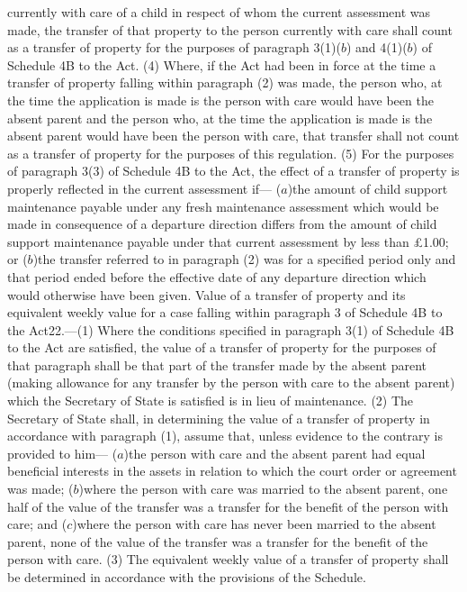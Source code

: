 \documentclass[a4paper]{article}
\begin{document}
currently with care of a child in respect of whom the current assessment was
made, the transfer of that property to the person currently with care shall
count as a transfer of property for the purposes of paragraph 3(1)($b$) and
4(1)($b$) of Schedule 4B to the Act.
(4) Where, if the Act had been in force at the time a transfer of property
falling within paragraph (2) was made, the person who, at the time the
application is made is the person with care would have been the absent parent
and the person who, at the time the application is made is the absent parent
would have been the person with care, that transfer shall not count as a
transfer of property for the purposes of this regulation.
(5) For the purposes of paragraph 3(3) of Schedule 4B to the Act, the effect of
a transfer of property is properly reflected in the current assessment if—
($a$)the amount of child support maintenance payable under any fresh maintenance
assessment which would be made in consequence of a departure direction differs
from the amount of child support maintenance payable under that current
assessment by less than £1.00; or
($b$)the transfer referred to in paragraph (2) was for a specified period only and
that period ended before the effective date of any departure direction which
would otherwise have been given.
Value of a transfer of property and its equivalent weekly value for a case
falling within paragraph 3 of Schedule 4B to the Act22.—(1) Where the conditions
specified in paragraph 3(1) of Schedule 4B to the Act are satisfied, the value
of a transfer of property for the purposes of that paragraph shall be that part
of the transfer made by the absent parent (making allowance for any transfer by
the person with care to the absent parent) which the Secretary of State is
satisfied is in lieu of maintenance.
(2) The Secretary of State shall, in determining the value of a transfer of
property in accordance with paragraph (1), assume that, unless evidence to the
contrary is provided to him—
($a$)the person with care and the absent parent had equal beneficial interests in
the assets in relation to which the court order or agreement was made;
($b$)where the person with care was married to the absent parent, one half of the
value of the transfer was a transfer for the benefit of the person with care;
and
($c$)where the person with care has never been married to the absent parent, none
of the value of the transfer was a transfer for the benefit of the person with
care.
(3) The equivalent weekly value of a transfer of property shall be determined in
accordance with the provisions of the Schedule.
\end{document}
